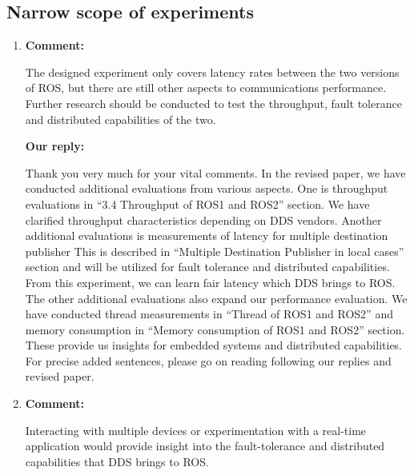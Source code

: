 \documentclass{article}
\begin{document}
\subsection{Narrow scope of experiments}
\begin{enumerate}

\item \begin{flushleft}
    \textbf{Comment:}
  \end{flushleft}
  The designed experiment only covers latency rates between the two versions of ROS, but there are still other aspects to communications performance. Further research should be conducted to test the throughput, fault tolerance and distributed capabilities of the two.
  
  \begin{flushleft}
    \textbf{Our reply:}
  \end{flushleft}
  Thank you very much for your vital comments.
  In the revised paper, we have conducted additional evaluations from various aspects.
  One is throughput evaluations in ``3.4 Throughput of ROS1 and ROS2'' section.
  We have clarified throughput characteristics depending on DDS vendors.
  Another additional evaluations is measurements of latency for multiple destination publisher
  This is described in ``Multiple Destination Publisher in local cases'' section and will be utilized for fault tolerance and distributed capabilities.
  From this experiment, we can learn fair latency which DDS brings to ROS.
  The other additional evaluations also expand our performance evaluation.
  We have conducted thread measurements in ``Thread of ROS1 and ROS2'' and memory consumption in ``Memory consumption of ROS1 and ROS2'' section.
  These provide us insights for embedded systems and distributed capabilities.
  For precise added sentences, please go on reading following our replies and revised paper.
 
\item \begin{flushleft}
    \textbf{Comment:}
  \end{flushleft}
  Interacting with multiple devices or experimentation with a real-time application would provide insight into the fault-tolerance and distributed capabilities that DDS brings to ROS.


\end{enumerate}
\end{document}

